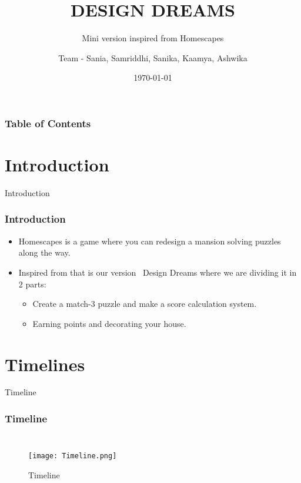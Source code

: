 \documentclass[10pt]{beamer}
\title[TECH TITANS]{DESIGN DREAMS}
\subtitle{ Mini version inspired from Homescapes}
\author[Team - Sania, Samriddhi, Sanika, Kaamya, Ashwika]{Team - Sania, Samriddhi, Sanika, Kaamya, Ashwika}
\institute[]{Project Progress Presentation}
\date[\textcolor{white}{\today} ]
{\today}
\begin{document}
\frame{\titlepage}
\begin{frame}
\frametitle{Table of Contents}
\tableofcontents
\end{frame}

\section{Introduction}
    \begin{frame}{Introduction}
    \frametitle{Introduction}
        \begin{itemize}
            \item Homescapes is a game where you can redesign a mansion solving puzzles along the way.
            \item Inspired from that is our version~ Design Dreams where we are dividing it in 2 parts:
        \begin{itemize}
            \item  Create a match-3 puzzle and make a score calculation system.

            \item  Earning points and decorating your house.
        \end{itemize}
        \end{itemize}
    \end{frame}
\section{Timelines}
\begin{frame}{Timeline}
    \frametitle{Timeline}
    \begin{columns}
        \begin{figure}
        \texttt{[image: Timeline.png]}
        \caption{Timeline}
        \end{figure}
       
    
    \end{columns}
\end{frame}
\end{document}
